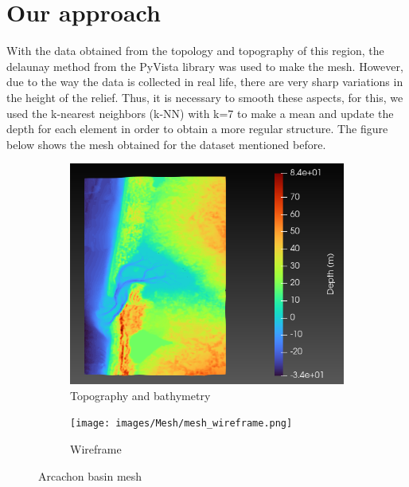\section{Our approach}
With the data obtained from the topology and topography of this region, the delaunay method from the PyVista library was used to make the mesh. However, due to the way the data is collected in real life, there are very sharp variations in the height of the relief.
Thus, it is necessary to smooth these aspects, for this, we used the k-nearest neighbors (k-NN) with k=7 to make a mean and update the depth for each element in order to obtain a more regular structure. The figure below shows the mesh obtained for the dataset mentioned before.
\begin{figure}[h]
\begin{subfigure}{.5\textwidth}
    \centering
    \includegraphics[width=0.7\linewidth]{images/Mesh/mesh_wireframe1.png}
    \caption{Topography and bathymetry}
    \label{fig:sub1}
\end{subfigure}%
\begin{subfigure}{0.6\textwidth}
    \centering
    \texttt{[image: images/Mesh/mesh\_wireframe.png]}
    \caption{Wireframe}
    \label{fig:sub2}
\end{subfigure}%
\caption{Arcachon basin mesh}
\label{fig:test}
\end{figure}

\vspace{-0.75cm}
